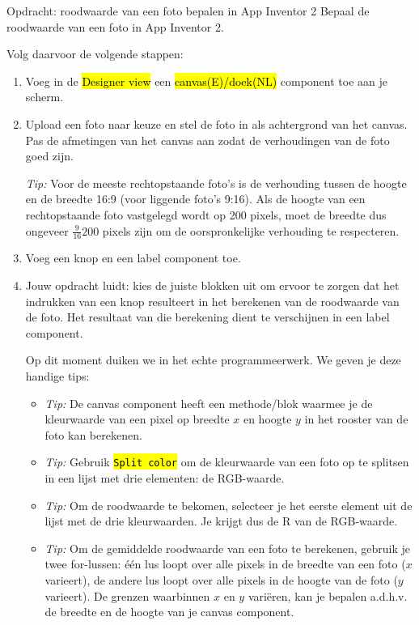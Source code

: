 \begin{opdracht}{Opdracht: roodwaarde van een foto bepalen in App Inventor 2}
Bepaal de roodwaarde van een foto in App Inventor 2.

Volg daarvoor de volgende stappen:
\begin{enumerate}
	\item Voeg  in de \hl{Designer view} een \hl{canvas(E)/doek(NL)} component toe aan je scherm. 
	\item Upload een foto naar keuze en stel de foto in als achtergrond van het canvas.
	Pas de afmetingen van het canvas aan zodat de verhoudingen van de foto goed zijn. 
	
	\emph{Tip:} Voor de meeste rechtopstaande foto's is de verhouding tussen de hoogte en de breedte 16:9 (voor liggende foto's 9:16). Als de hoogte van een rechtopstaande foto vastgelegd wordt op 200 pixels, moet de breedte dus ongeveer $\frac{9}{16}200$ pixels zijn om de oorspronkelijke verhouding te respecteren.
	 
	\item Voeg een knop en een label component toe.
	
	\item Jouw opdracht luidt: kies de juiste blokken uit om ervoor te zorgen dat het indrukken van een knop resulteert in het berekenen van de roodwaarde van de foto. Het resultaat van die berekening dient te verschijnen in een label component. 
	
	Op dit moment duiken we in het echte programmeerwerk. We geven je deze handige tips:
	
	\begin{itemize}
		\item \emph{Tip:} De canvas component heeft een methode/blok waarmee je de kleurwaarde van een pixel op breedte $x$ en hoogte $y$ in het rooster van de foto kan berekenen. 
		
		\item \emph{Tip:} Gebruik \hl{\texttt{Split color}} om de kleurwaarde van een foto op te splitsen in een lijst met drie elementen: de RGB-waarde.
		
		\item \emph{Tip:} Om de roodwaarde te bekomen, selecteer je het eerste element uit de lijst met de drie kleurwaarden. Je krijgt dus de R van de RGB-waarde.
		
		\item \emph{Tip:} Om de gemiddelde roodwaarde van een foto te berekenen, gebruik je twee for-lussen: \'e\'en lus loopt over alle pixels in de breedte van een foto ($x$ varieert), de andere lus loopt over alle pixels in de hoogte van de foto ($y$ varieert). De grenzen waarbinnen $x$ en $y$ vari\"eren, kan je bepalen a.d.h.v. de breedte en de hoogte van je canvas component.
		

\end{itemize}
\end{enumerate}
\end{opdracht}
